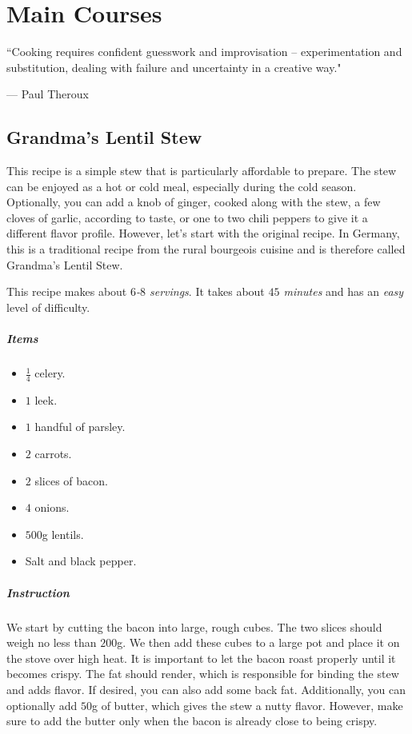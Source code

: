 \chapter{Main Courses}
\label{mains}
\epigraph{``Cooking requires confident guesswork and improvisation -- experimentation and substitution, dealing with failure and uncertainty in a creative way."}{--- \textup{Paul Theroux}}

\section{Grandma's Lentil Stew}
\label{grandmaslentilsstew}

This recipe is a simple stew that is particularly affordable to prepare. The stew can be enjoyed as a hot or cold meal, especially during the cold season. Optionally, you can add a knob of ginger, cooked along with the stew, a few cloves of garlic, according to taste, or one to two chili peppers to give it a different flavor profile. However, let's start with the original recipe. In Germany, this is a traditional recipe from the rural bourgeois cuisine and is therefore called Grandma's Lentil Stew.

This recipe makes about \emph{$6$-$8$ servings}. It takes about \emph{$45$ minutes} and has an \emph{easy} level of difficulty. 

\paragraph{Items}
\begin{itemize}[noitemsep]
	\item[\ding{182}] $\frac{1}{4}$ celery.
	\item[\ding{183}] $1$ leek.
	\item[\ding{184}] $1$ handful of parsley.
	\item[\ding{185}] $2$ carrots.
	\item[\ding{186}] $2$ slices of bacon.
	\item[\ding{187}] $4$ onions.
	\item[\ding{188}] $500$g lentils.
	\item[\ding{189}] Salt and black pepper.
\end{itemize}

\paragraph{Instruction} 
We start by cutting the bacon into large, rough cubes. The two slices should weigh no less than $200$g. We then add these cubes to a large pot and place it on the stove over high heat. It is important to let the bacon roast properly until it becomes crispy. The fat should render, which is responsible for binding the stew and adds flavor. If desired, you can also add some back fat. Additionally, you can optionally add $50$g of butter, which gives the stew a nutty flavor. However, make sure to add the butter only when the bacon is already close to being crispy. 

